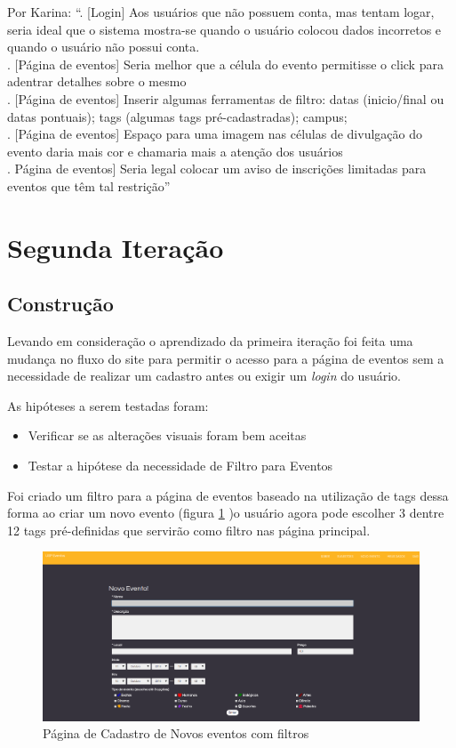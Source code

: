 \begin{itemize}
\par Por Karina: ``. [Login] Aos usuários que não possuem conta, mas tentam logar, seria ideal que o sistema mostra-se quando o usuário colocou dados incorretos e quando o usuário não possui conta.
\\
. [Página de eventos] Seria melhor que a célula do evento permitisse o click para adentrar detalhes sobre o mesmo
\\
. [Página de eventos] Inserir algumas ferramentas de filtro: datas (inicio/final ou datas pontuais); tags (algumas tags pré-cadastradas); campus;
\\
. [Página de eventos] Espaço para uma imagem nas células de divulgação do evento daria mais cor e chamaria mais a atenção dos usuários
\\
. Página de eventos] Seria legal colocar um aviso de inscrições limitadas para eventos que têm tal restrição''

\end{itemize}
\section{Segunda Iteração}
\subsection{Construção}
\par Levando em consideração o aprendizado da primeira iteração foi feita uma mudança no fluxo do site para permitir o acesso para a página de eventos sem a necessidade de realizar um cadastro antes ou exigir um \emph{login} do usuário.
\par As hipóteses a serem testadas foram:
\begin{itemize}
\item Verificar se as alterações visuais foram bem aceitas
\item Testar a hipótese da necessidade de Filtro para Eventos
\end{itemize}
\par Foi criado um filtro para a página de eventos baseado na utilização de tags dessa forma ao criar um novo evento (figura \ref{fig:event_newv2} )o usuário agora pode escolher 3 dentre 12 tags pré-definidas que servirão como filtro nas página principal.
        \begin{figure}[htb]
        \centering
		\includegraphics[width=15cm]{figuras/event_newv2}
		\caption{\label{fig:event_newv2} Página de Cadastro de Novos eventos com filtros}
		\end{figure}

